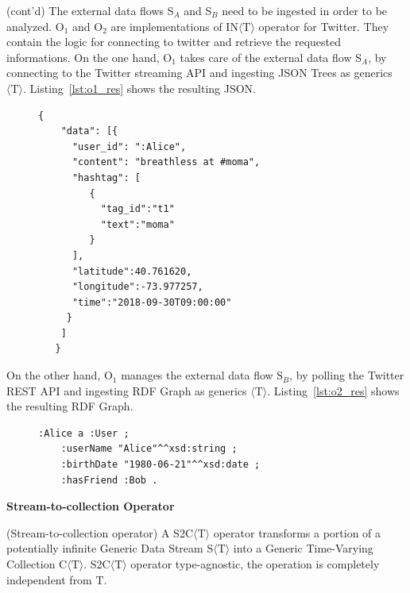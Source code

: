 \begin{Example}
(cont'd) The external data flows S$_A$ and S$_B$ need to be ingested in order to be analyzed.
O$_1$ and O$_2$ are implementations of IN$\langle\mathrm{T}\rangle$ operator for Twitter. 
They contain the logic for connecting to twitter and retrieve the requested informations.
On the one hand, O$_1$ takes care of the external data flow S$_A$, by connecting to the Twitter streaming API and ingesting JSON Trees as generics $\langle\mathrm{T}\rangle$.
Listing~\ref{lst:o1_res} shows the resulting JSON.

\begin{figure}[ht]
\begin{minipage}{0.95\linewidth}
\begin{lstlisting}[caption={Example of the data resulting by the ingestion operation performed by O$_1$.},label=lst:o1_res,style=JSON]
  {
    "data": [{
      "user_id": ":Alice",
      "content": "breathless at #moma",
      "hashtag": [
         { 
           "tag_id":"t1"
           "text":"moma"
         }
      ],
      "latitude":40.761620,
      "longitude":-73.977257,
      "time":"2018-09-30T09:00:00"
     }
    ]
   }
\end{lstlisting}
\end{minipage}
\end{figure}

On the other hand, O$_1$ manages the external data flow S$_B$, by polling the Twitter REST API and ingesting RDF Graph as generics $\langle\mathrm{T}\rangle$.
Listing~\ref{lst:o2_res} shows the resulting RDF Graph.

\begin{figure}[ht]
\begin{minipage}{0.95\linewidth}
\begin{lstlisting}[caption={Example of the data resulting by the ingestion operation performed by O$_2$.},label=lst:o2_res,style=N3]
:Alice a :User ;
    :userName "Alice"^^xsd:string ;
    :birthDate "1980-06-21"^^xsd:date ;
    :hasFriend :Bob .
\end{lstlisting}
\end{minipage}
\end{figure}

\end{Example}

\medskip
\noindent
\textbf{Stream-to-collection Operator}
\medskip

\begin{Definition}
(Stream-to-collection operator) A S2C$\langle\mathrm{T}\rangle$ operator transforms a portion of a potentially infinite Generic Data Stream S$\langle\mathrm{T}\rangle$ into a Generic Time-Varying Collection C$\langle\mathrm{T}\rangle$.
S2C$\langle\mathrm{T}\rangle$ operator type-agnostic, the operation is completely independent from $\mathrm{T}$.
\end{Definition}

